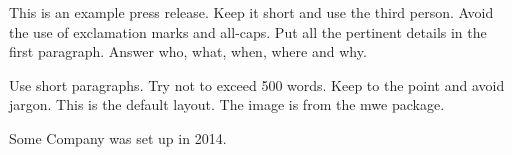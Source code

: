 \documentclass[a4paper,11pt]{pressrelease}
\begin{document}
\begin{pressrelease}

This is an example press release. Keep it short and use the third
person. Avoid the use of exclamation marks and all-caps. Put all the
pertinent details in the first paragraph. Answer who, what, when,
where and why.

Use short paragraphs. Try not to exceed 500 words. Keep to the point
and avoid jargon. This is the default layout. The image is from the
\textsf{mwe} package.

\begin{about}
Some Company was set up in 2014.
\end{about}

\end{pressrelease}
\end{document}
